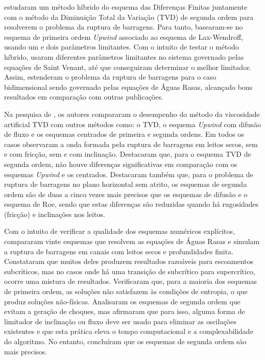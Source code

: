  estudaram um método híbrido do esquema das Diferenças Finitas juntamente com o método da Diminuição Total da Variação (TVD) de segunda ordem para resolverem o problema da ruptura de barragens. Para tanto, basearam-se  no esquema de primeira ordem \textit{Upwind} associado ao esquema de Lax-Wendroff, usando um e dois parâmetros limitantes. Com o intuito de testar o método híbrido, usaram diferentes parâmetros limitantes no sistema governado pelas equações de Saint Venant, até que conseguiram determinar o melhor limitador. Assim, estenderam o problema da ruptura de barragens para o caso bidimensional sendo governado pelas equações de Águas Rasas, alcançado bons resultados em comparação com outras publicações.

Na pesquisa de , os autores compararam o desempenho do método da viscosidade artificial TVD com outros métodos como: o TVD, o esquema \textit{Upwind} com difusão de fluxo e os esquemas centrados de primeira e segunda ordens. Em todos os casos observaram a onda formada pela ruptura de barragens em leitos secos, sem e com fricção, sem e com inclinação. Destacaram que, para o esquema TVD de segunda ordem, não houve diferenças significativas em comparação com os esquemas \textit{Upwind} e os centrados. Destacaram também que, para o problema de ruptura de barragens no plano horizontal sem atrito, os esquemas de segunda ordem são de duas a cinco vezes mais precisos que os esquemas de difusão e o esquema de Roe, sendo que estas diferenças são reduzidas quando há rugosidades (fricção) e inclinações nos leitos.

Com o intuito de verificar a qualidade dos esquemas numéricos explícitos,  compararam vinte esquemas que resolvem as equações de Águas Rasas e simulam a ruptura de barragens em canais com leitos secos e profundidades finita. Constataram que muitos deles produzem resultados razoáveis para escoamentos subcríticos, mas no casos onde há uma transição de subcrítico para supercrítico, ocorre uma mistura de resultados. Verificaram que, para a maioria dos esquemas de primeira ordem, as soluções não satisfazem às condições de entropia, o que produz soluções não-físicas. Analisaram os esquemas de segunda ordem que evitam a geração de choques, mas afirmaram que para isso, alguma forma de limitador de inclinação ou fluxo deve ser usado para eliminar as oscilações existentes e que esta prática eleva o tempo computacional e a complexabilidade do algoritmo. No entanto, concluíram que os esquemas de segunda ordem são mais precisos.

